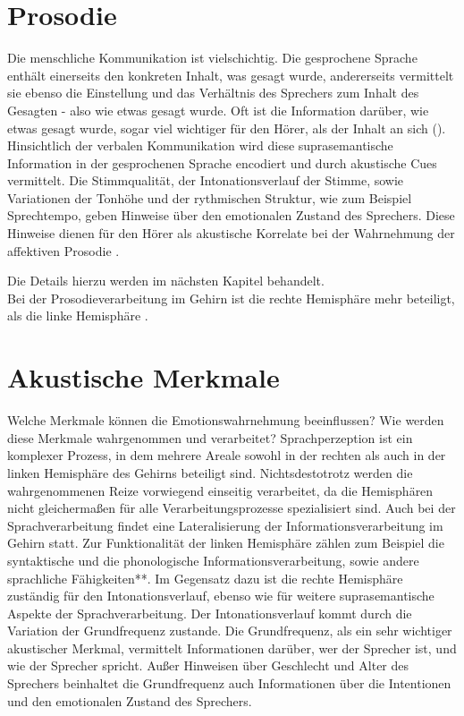 \documentclass[11pt,a4paper,headsepline,twoside,toc=bibliography]{scrreprt}
\begin{document}
\section{Prosodie}
\label{sec:prosody}

Die menschliche Kommunikation ist vielschichtig. Die gesprochene Sprache enthält einerseits den konkreten Inhalt, was gesagt wurde, andererseits vermittelt sie ebenso die Einstellung und das Verhältnis des Sprechers zum Inhalt des Gesagten - also wie etwas gesagt wurde. Oft ist die Information darüber, wie etwas gesagt wurde, sogar viel wichtiger für den Hörer, als der Inhalt an sich (\textcite{Wildgruber2006}). Hinsichtlich der verbalen Kommunikation wird diese suprasemantische Information in der gesprochenen Sprache encodiert und durch akustische Cues vermittelt. Die Stimmqualität, der Intonationsverlauf der Stimme, sowie Variationen der Tonhöhe und der rythmischen Struktur, wie zum Beispiel Sprechtempo, geben Hinweise über den emotionalen Zustand des Sprechers. Diese Hinweise dienen für den Hörer als akustische Korrelate bei der Wahrnehmung der affektiven Prosodie . 

Die Details hierzu werden im nächsten Kapitel behandelt. \\  

Bei der Prosodieverarbeitung im Gehirn ist die rechte Hemisphäre mehr beteiligt, als die linke Hemisphäre \parencite{Ackermann2014c} .  

\section{Akustische Merkmale}
\label{sec:prosody_features}


Welche Merkmale können die Emotionswahrnehmung beeinflussen? Wie werden diese Merkmale wahrgenommen und verarbeitet? Sprachperzeption ist ein komplexer Prozess, in dem mehrere Areale sowohl in der rechten als auch in der linken Hemisphäre des Gehirns beteiligt sind. Nichtsdestotrotz werden die wahrgenommenen Reize vorwiegend einseitig verarbeitet, da die Hemisphären nicht gleichermaßen für alle Verarbeitungsprozesse spezialisiert sind. Auch bei der Sprachverarbeitung findet eine Lateralisierung der Informationsverarbeitung im Gehirn statt. Zur Funktionalität der linken Hemisphäre zählen zum Beispiel die syntaktische und die phonologische Informationsverarbeitung, sowie andere sprachliche Fähigkeiten**. Im  Gegensatz dazu ist die rechte Hemisphäre zuständig für den Intonationsverlauf, ebenso wie für weitere suprasemantische Aspekte der Sprachverarbeitung. Der Intonationsverlauf kommt durch die Variation der Grundfrequenz zustande. Die Grundfrequenz, als ein sehr wichtiger akustischer Merkmal, vermittelt Informationen darüber, wer der Sprecher ist, und wie der Sprecher spricht. Außer Hinweisen über Geschlecht und Alter des Sprechers beinhaltet die Grundfrequenz auch Informationen über die Intentionen und den emotionalen Zustand des Sprechers. \\
\end{document}
